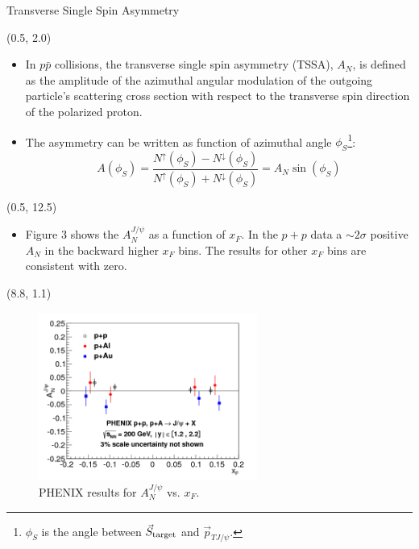 \documentclass[10pt, xcolor={dvipsnames}, aspectratio = 169]{beamer}
\newcommand{\citeme}[1]{{\tiny \footfullcite{#1}}}
\newcommand{\pp}{$p\bar{p}$ }
\begin{document}
\begin{frame}{Transverse Single Spin Asymmetry}

\begin{textblock}{8.0}(0.5, 2.0)

\begin{itemize}

\item In \pp collisions, the transverse single spin asymmetry (TSSA), $A_{N}$, is defined as the amplitude of the
azimuthal angular modulation of the outgoing particle’s scattering cross section with respect to the transverse spin
direction of the polarized proton.

\item The asymmetry can be written as function of azimuthal angle $\phi_{S}$\footnote{\tiny {$\phi_{S}$ is the angle
between $\vec{S}_{\rm target}$ and $\vec{p}_{TJ/\psi}$}.}:
%
\begin{equation*}
    A(\phi_{S}) = \frac{N^{\uparrow}(\phi_{S}) - N^{\downarrow}(\phi_{S})}{N^{\uparrow}(\phi_{S}) + N^{\downarrow}(\phi_{S})} = A_{N}\sin(\phi_{S})
\end{equation*}
%
%
\end{itemize}
\end{textblock}

\begin{textblock}{15.0}(0.5, 12.5)
\begin{itemize}
\item Figure 3 shows the $A_{N}^{J/\psi}$ as a function of $x_{F}$. In the $p+p$ data a $\sim 2\sigma$ positive $A_{N}$
in the backward higher $x_{F}$ bins. The results for other $x_{F}$ bins are consistent with zero.
\end{itemize}
\end{textblock}


\begin{textblock}{7.0}(8.8, 1.1)

\begin{figure}
    \centering
    \includegraphics[height = 5.5cm]{imgs/final_xf.png}
    \caption{PHENIX results for $A^{J/\psi}_{N}$ vs. $x_{F}$. \citeme{PHENIX:2018qvl}}
\end{figure}

\end{textblock}

\end{frame}
\end{document}
